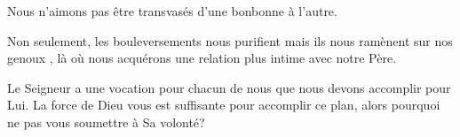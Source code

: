 Nous n'aimons pas être transvasés d'une bonbonne à l'autre. 


Non seulement, les bouleversements nous purifient mais ils nous ramènent
 \og sur nos genoux \fg{}, là où nous acquérons une relation plus intime
 avec notre Père. 

Le Seigneur a une vocation pour chacun de nous que nous devons accomplir
 pour Lui. La force de Dieu vous est suffisante pour accomplir ce plan,
 alors pourquoi ne pas vous soumettre à Sa volonté? 

\dvrule



